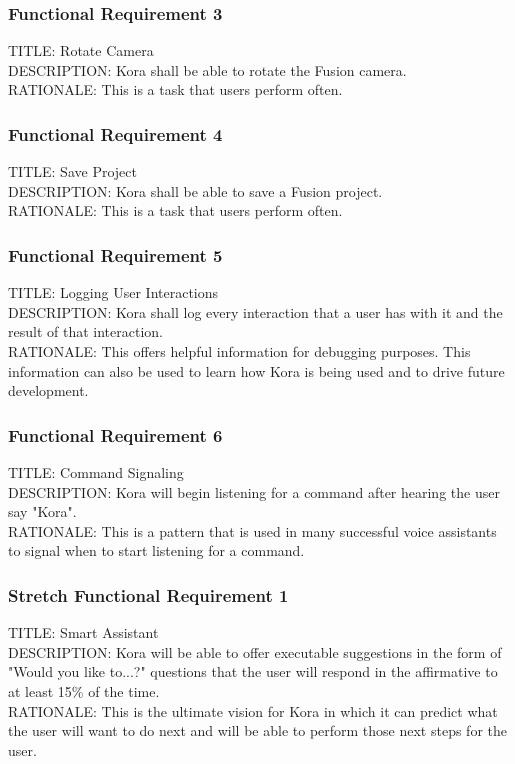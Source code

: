 \documentclass[onecolumn, draftclsnofoot,10pt, compsoc]{IEEEtran}
\def \botname{Kora\xspace}
\begin{document}
	\subsubsection{Functional Requirement 3}
	TITLE: Rotate Camera \\
	DESCRIPTION: \botname shall be able to rotate the Fusion camera. \\
	RATIONALE: This is a task that users perform often.

	\subsubsection{Functional Requirement 4}
	TITLE: Save Project \\
	DESCRIPTION: \botname shall be able to save a Fusion project. \\
	RATIONALE: This is a task that users perform often.

	\subsubsection{Functional Requirement 5}
	TITLE: Logging User Interactions \\
	DESCRIPTION: \botname shall log every interaction that a user has with it and the result of that interaction. \\
	RATIONALE: This offers helpful information for debugging purposes. This information can also be used to learn how \botname is being used and to drive future development.

	\subsubsection{Functional Requirement 6}
	TITLE: Command Signaling \\
	DESCRIPTION: \botname will begin listening for a command after hearing the user say "\botname". \\
	RATIONALE: This is a pattern that is used in many successful voice assistants to signal when to start listening for a command.


	\subsubsection{Stretch Functional Requirement 1}
	TITLE: Smart Assistant \\
	DESCRIPTION: \botname will be able to offer executable suggestions in the form of "Would you like to...?" questions that the user will respond in the affirmative to at least 15\% of the time. \\
	RATIONALE: This is the ultimate vision for \botname in which it can predict what the user will want to do next and will be able to perform those next steps for the user.
\end{document}
